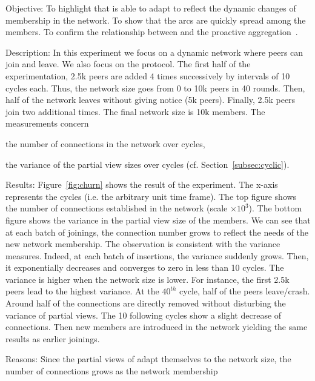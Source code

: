 \begin{asparadesc}
\item[Objective:] To highlight that \SPRAY is able to adapt to reflect the
  dynamic changes of membership in the network. To show that the arcs are
  quickly spread among the members. To confirm the relationship between \SPRAY
  and the proactive aggregation~\cite{jelasity2004epidemic}.
\item[Description:] In this experiment we focus on a dynamic network where
  peers can join and leave. We also focus on the \SPRAY protocol. The first
  half of the experimentation, 2.5k peers are added 4 times successively by
  intervals of 10 cycles each. Thus, the network size goes from 0 to 10k peers
  in 40 rounds. Then, half of the network leaves without giving notice (5k
  peers). Finally, 2.5k peers join two additional times. The final network size
  is 10k members. The measurements concern
  \begin{inparaenum}
  \item the number of connections in the network over cycles,
  \item the variance of the partial view sizes over cycles
    (cf. Section~\ref{subsec:cyclic}).
  \end{inparaenum}
\item[Results:] Figure~\ref{fig:churn} shows the result of the experiment. The
  x-axis represents the cycles (i.e. the arbitrary unit time frame). The top
  figure shows the number of connections established in the network (scale
  $\times 10^3$). The bottom figure shows the variance in the partial view size
  of the members. We can see that at each batch of joinings, the connection
  number grows to reflect the needs of the new network membership. The
  observation is consistent with the variance measures. Indeed, at each batch
  of insertions, the variance suddenly grows. Then, it exponentially decreases
  and converges to zero in less than 10 cycles. The variance is higher when the
  network size is lower. For instance, the first 2.5k peers lead to the highest
  variance. At the $40^{th}$ cycle, half of the peers leave/crash. Around half
  of the connections are directly removed without disturbing the variance of
  partial views. The 10 following cycles show a slight decrease of
  connections. Then new members are introduced in the network yielding the same
  results as earlier joinings.
\item[Reasons:] Since the partial views of \SPRAY adapt themselves to the
  network size, the number of connections grows as the network membership

\end{asparadesc}
